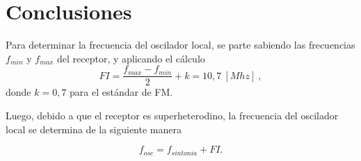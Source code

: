   \section{Conclusiones}

  Para determinar la frecuencia del oscilador local, se parte sabiendo las frecuencias 
  \(f_{min}\) y \(f_{max}\) del receptor, y
  aplicando el cálculo 
    \begin{equation*}
      FI = \dfrac{f_{max} - f_{min}}{2} + k = 10,7~[Mhz]~,
    \end{equation*}
  donde \(k = 0,7\) para el estándar de FM.
  
  Luego, debido a que el receptor es superheterodino, la 
  frecuencia del oscilador local se determina de la siguiente 
  manera
    
    \begin{equation*}
      f_{osc} = f_{sintonia} +FI .
    \end{equation*}
